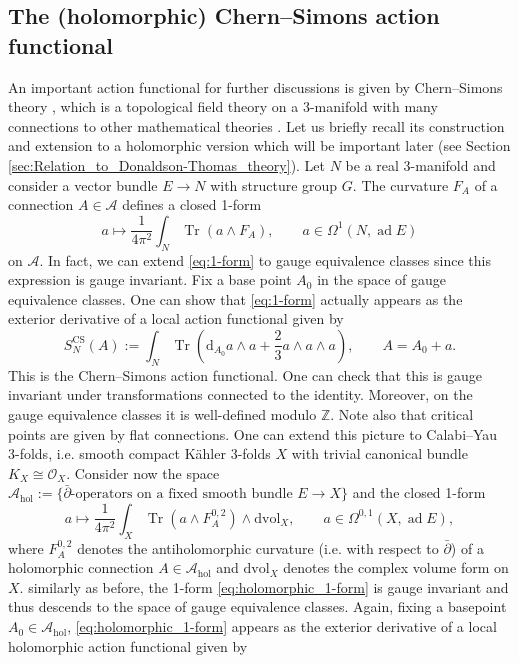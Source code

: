 \documentclass[11pt,colorinlistoftodos]{amsart}
\numberwithin{equation}{subsection}
\theoremstyle{plain}
\theoremstyle{definition}
\theoremstyle{remark}
\newcommand{\Z}{\mathbb{Z}}
\newcommand{\dd}{{\mathrm{d}}}
\DeclareMathOperator{\tr}{Tr}
\DeclareMathOperator{\ad}{ad}
\newcommand{\de}{\partial}
\newcommand{\calA}{\mathcal{A}}
\newcommand{\calO}{\mathcal{O}}
\begin{document}
\subsection{The (holomorphic) Chern--Simons action functional}
\label{subsec:Chern-Simons}
An important action functional for further discussions is given by Chern--Simons theory \cite{Chern1974}, which is a topological field theory on a 3-manifold with many connections to other mathematical theories \cite{Witten1989,Reshetikhin1991,Cattaneo2008}. Let us briefly recall its construction and extension to a holomorphic version which will be important later (see Section \ref{sec:Relation_to_Donaldson-Thomas_theory}). Let $N$ be a real 3-manifold and consider a vector bundle $E\to N$ with structure group $G$. The curvature $F_A$ of a connection $A\in\calA$ defines a closed 1-form
\begin{equation}
\label{eq:1-form}
a\mapsto \frac{1}{4\pi^2}\int_N\tr(a\land F_A),\qquad a\in\Omega^1(N,\ad E)
\end{equation}
on $\calA$. In fact, we can extend \eqref{eq:1-form} to gauge equivalence classes since this expression is gauge invariant. Fix a base point $A_0$ in the space of gauge equivalence classes. One can show that \eqref{eq:1-form} actually appears as the exterior derivative of a local action functional given by 
\begin{equation}
    \label{eq:Chern-Simons_action}
    S^\mathrm{CS}_N(A):=\int_N\tr\left(\dd_{A_0}a\land a+\frac{2}{3}a\land a\land a\right),\qquad A=A_0+a.
\end{equation}
This is the Chern--Simons action functional. One can check that this is gauge invariant under transformations connected to the identity. Moreover, on the gauge equivalence classes it is well-defined modulo $\Z$. Note also that critical points are given by flat connections. One can extend this picture to Calabi--Yau 3-folds, i.e. smooth compact K\"ahler 3-folds $X$ with trivial canonical bundle $K_X\cong \calO_X$. Consider now the space $\calA_\mathrm{hol}:=\{\bar\de\text{-operators on a fixed smooth bundle $E\to X$}\}$ and the closed 1-form
\begin{equation}
\label{eq:holomorphic_1-form}
a\mapsto \frac{1}{4\pi^2}\int_X\tr\left(a\land F^{0,2}_A\right)\land \dd\text{vol}_X,\qquad a\in\Omega^{0,1}(X,\ad E),
\end{equation}
where $F^{0,2}_A$ denotes the antiholomorphic curvature (i.e. with respect to $\bar\de$) of a holomorphic connection $A\in\calA_\mathrm{hol}$ and $\dd\text{vol}_X$ denotes the complex volume form on $X$. similarly as before, the 1-form \eqref{eq:holomorphic_1-form} is gauge invariant and thus descends to the space of gauge equivalence classes. Again, fixing a basepoint $A_0\in\calA_\mathrm{hol}$, \eqref{eq:holomorphic_1-form} appears as the exterior derivative of a local holomorphic action functional given by 
\end{document}

